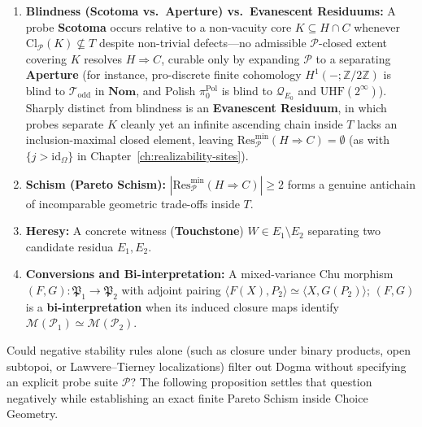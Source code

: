 \begin{definition}
\begin{enumerate}
  \item \textbf{Blindness (Scotoma vs.\ Aperture) vs.\ Evanescent Residuums:} A probe \textbf{Scotoma} occurs relative to a non-vacuity core $K \subseteq H \cap C$ whenever $\mathrm{Cl}_{\mathcal{P}}(K) \not\subseteq T$ despite non-trivial defects---no admissible $\mathcal{P}$-closed extent covering $K$ resolves $H \Rightarrow C$, curable only by expanding $\mathcal{P}$ to a separating \textbf{Aperture} (for instance, pro-discrete finite cohomology $H^1(-;\mathbb{Z}/2\mathbb{Z})$ is blind to $\mathcal{T}_{\mathrm{odd}}$ in $\mathbf{Nom}$, and Polish $\pi_0^{\mathrm{Pol}}$ is blind to $\mathcal{Q}_{E_0}$ and $\mathrm{UHF}(2^\infty)$). Sharply distinct from blindness is an \textbf{Evanescent Residuum}, in which probes separate $K$ cleanly yet an infinite ascending chain inside $T$ lacks an inclusion-maximal closed element, leaving $\mathrm{Res}_{\mathcal{P}}^{\min}(H \Rightarrow C) = \emptyset$ (as with $\{j > \mathrm{id}_\Omega\}$ in Chapter~\ref{ch:realizability-sites}).
  \item \textbf{Schism (Pareto Schism):} $|\mathrm{Res}_{\mathcal{P}}^{\min}(H \Rightarrow C)| \ge 2$ forms a genuine antichain of incomparable geometric trade-offs inside $T$.
  \item \textbf{Heresy:} A concrete witness (\textbf{Touchstone}) $W \in E_1 \setminus E_2$ separating two candidate residua $E_1, E_2$.
  \item \textbf{Conversions and Bi-interpretation:} A mixed-variance Chu morphism~\cite{Shulman20} $(F, G) : \mathfrak{P}_1 \to \mathfrak{P}_2$ with adjoint pairing $\langle F(X), P_2 \rangle \simeq \langle X, G(P_2) \rangle$; $(F, G)$ is a \textbf{bi-interpretation} when its induced closure maps identify $\mathcal{M}(\mathcal{P}_1) \simeq \mathcal{M}(\mathcal{P}_2)$.
\end{enumerate}
\end{definition}

Could negative stability rules alone (such as closure under binary products, open subtopoi, or Lawvere--Tierney localizations) filter out Dogma without specifying an explicit probe suite $\mathcal{P}$? The following proposition settles that question negatively while establishing an exact finite Pareto Schism inside Choice Geometry.


